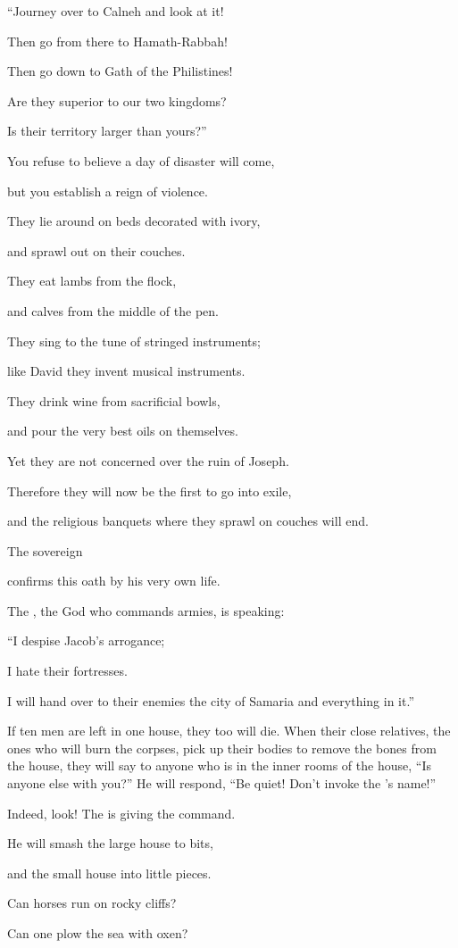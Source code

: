 {\par }{\Q “Journey over
to Calneh
and look
at it!
\par }{\Q Then go
from there
to Hamath-Rabbah!

\par }{\Q Then go down
to Gath
of the Philistines!
\par }{\Q Are they superior
to
our two kingdoms?
\par }{\Q Is their territory
larger
than
yours?”
\par }{\Q {}You refuse to believe
a day
of disaster
will come,
\par }{\Q but you establish a reign
of violence.
\par }{\Q {}They lie
around on
beds
decorated with ivory,
\par }{\Q and sprawl
out on
their couches.
\par }{\Q They eat
lambs
from the flock,
\par }{\Q and calves
from the middle
of the pen.
\par }{\Q {}They sing to the tune
of stringed instruments;
\par }{\Q like David
they invent
musical
instruments.
\par }{\Q {}They drink
wine
from sacrificial bowls,
\par }{\Q and pour
the very best
oils
on themselves.

\par }{\Q Yet they are not
concerned
over
the ruin
of Joseph.
\par }{\Q {}Therefore
they will now
be the first
to go into exile,
\par }{\Q and the religious
banquets
where they sprawl
on couches will end.
\par }{\Q {}The sovereign

{}
confirms this oath by
his very own life.
\par }{\Q The
{}, the God
who commands armies,
is speaking:
\par }{\Q “I
despise
Jacob’s
arrogance;
\par }{\Q I hate
their fortresses.
\par }{\Q I will hand over
to their enemies the city
of Samaria and everything in it.”
\par }{\Q {}If
ten
men
are left
in one
house,
they too will die.
When
their close relatives,
the ones who will burn the corpses, pick
up their bodies
to remove
the bones
from
the house,
they will say
to
anyone who
is in the inner rooms
of the house,
“Is anyone else
with
you?” He will respond,
“Be quiet! Don’t
invoke
the
{}’s
name!”
\par }{\Q {}Indeed,
look! The
{}
is giving the command.
\par }{\Q He will smash
the large
house
to bits,
\par }{\Q and the small
house
into little pieces.
\par }{\Q {}Can horses
run
on rocky cliffs?
\par }{\Q Can
one plow
the sea with oxen?

}
